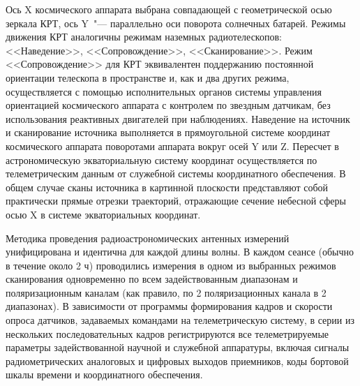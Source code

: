 Ось X космического аппарата выбрана совпадающей с
геометрической осью зеркала КРТ, ось Y~"--- параллельно оси поворота солнечных батарей. Режимы
движения КРТ аналогичны режимам наземных радиотелескопов: <<Наведение>>, <<Сопровождение>>,
<<Сканирование>>. Режим <<Сопровождение>> для КРТ эквивалентен поддержанию постоянной
ориентации телескопа в пространстве и, как и два других режима, осуществляется с помощью
исполнительных органов системы управления ориентацией космического аппарата с контролем по
звездным датчикам, без использования реактивных двигателей при наблюдениях.
Наведение на источник и сканирование источника выполняется в прямоугольной системе координат
космического аппарата поворотами аппарата вокруг осей Y или Z. Пересчет в астрономическую
экваториальную систему координат осуществляется по телеметрическим данным от служебной системы
координатного обеспечения. В общем случае сканы источника в картинной плоскости представляют собой
практически прямые отрезки траекторий, отражающие сечение небесной сферы осью X
в системе экваториальных координат.

Методика проведения радиоастрономических антенных измерений унифицирована и идентична для каждой
длины волны. В каждом сеансе (обычно в течение около 2 ч) проводились измерения в одном из выбранных
режимов сканирования одновременно по всем задействованным диапазонам и поляризационным каналам (как
правило, по 2 поляризационных канала в 2 диапазонах). В зависимости от программы формирования кадров
и скорости опроса датчиков, задаваемых командами на телеметрическую систему, в серии из нескольких
последовательных кадров регистрируются все телеметрируемые параметры задействованной научной и
служебной аппаратуры, включая сигналы радиометрических аналоговых и цифровых выходов приемников,
коды бортовой шкалы времени и координатного обеспечения.


